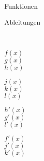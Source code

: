 \begin{Answer}[ref=schaubildZuordnenA1]\\
	\begin{minipage}{\textwidth}
		\begin{minipage}{0.5\textwidth}
			\centering Funktionen
		\end{minipage}
		\begin{minipage}{0.5\textwidth}
			\centering Ableitungen
		\end{minipage}\\
		\begin{minipage}[][][c]{0.24\textwidth}
			\centering\(f(x)\)\vspace{0.2cm}\\
			\centering\(g(x)\)\vspace{0.2cm}\\
			\centering\(h(x)\)
		\end{minipage}
		\begin{minipage}[][][c]{0.24\textwidth}
			\centering\(j(x)\)\vspace{0.2cm}\\
			\centering\(k(x)\)\vspace{0.2cm}\\
			\centering\(l(x)\)
		\end{minipage}
		\begin{minipage}[][][c]{0.24\textwidth}
			\centering\(h'(x)\)\vspace{0.2cm}\\
			\centering\(g'(x)\)\vspace{0.2cm}\\
			\centering\(l'(x)\)
		\end{minipage}
		\begin{minipage}[][][c]{0.24\textwidth}
			\centering\(f'(x)\)\vspace{0.2cm}\\
			\centering\(j'(x)\)\vspace{0.2cm}\\
			\centering\(k'(x)\)
		\end{minipage}
	\end{minipage}
\end{Answer}
